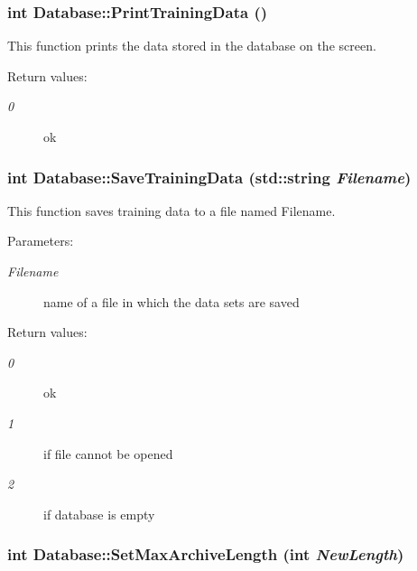 \subsubsection{\setlength{\rightskip}{0pt plus 5cm}int Database::Print\-Training\-Data ()}\label{classDatabase_a9}


This function prints the data stored in the database on the screen.

\begin{Desc}
\item[Return values: ]\par
\begin{description}
\item[{\em 
0}]ok \end{description}
\end{Desc}
\subsubsection{\setlength{\rightskip}{0pt plus 5cm}int Database::Save\-Training\-Data (std::string {\em Filename})}\label{classDatabase_a8}


This function saves training data to a file named Filename.

\begin{Desc}
\item[Parameters: ]\par
\begin{description}
\item[{\em 
Filename}]name of a file in which the data sets are saved \end{description}
\end{Desc}
\begin{Desc}
\item[Return values: ]\par
\begin{description}
\item[{\em 
0}]ok \item[{\em 
1}]if file cannot be opened \item[{\em 
2}]if database is empty \end{description}
\end{Desc}
\subsubsection{\setlength{\rightskip}{0pt plus 5cm}int Database::Set\-Max\-Archive\-Length (int {\em New\-Length})}\label{classDatabase_a15}


